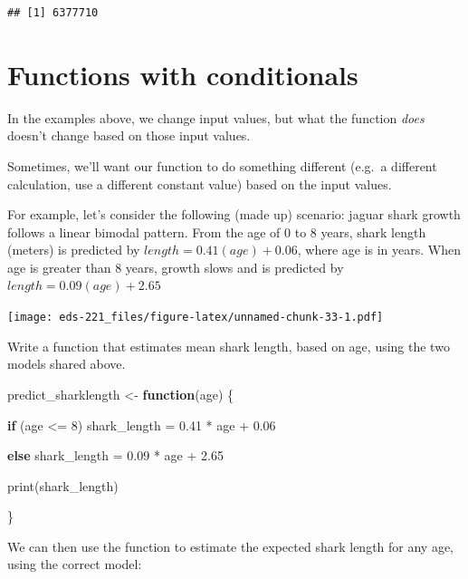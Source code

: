 \documentclass[
]{book}
\newenvironment{Shaded}{\begin{snugshade}}{\end{snugshade}}
\newcommand{\ControlFlowTok}[1]{\textcolor[rgb]{0.13,0.29,0.53}{\textbf{#1}}}
\newcommand{\DecValTok}[1]{\textcolor[rgb]{0.00,0.00,0.81}{#1}}
\newcommand{\FloatTok}[1]{\textcolor[rgb]{0.00,0.00,0.81}{#1}}
\newcommand{\FunctionTok}[1]{\textcolor[rgb]{0.00,0.00,0.00}{#1}}
\newcommand{\NormalTok}[1]{#1}
\newcommand{\OtherTok}[1]{\textcolor[rgb]{0.56,0.35,0.01}{#1}}
\newcommand{\SpecialCharTok}[1]{\textcolor[rgb]{0.00,0.00,0.00}{#1}}
\begin{document}
\begin{verbatim}
## [1] 6377710
\end{verbatim}

\hypertarget{functions-with-conditionals}{%
\section{Functions with conditionals}\label{functions-with-conditionals}}

In the examples above, we change input values, but what the function \emph{does} doesn't change based on those input values.

Sometimes, we'll want our function to do something different (e.g.~a different calculation, use a different constant value) based on the input values.

For example, let's consider the following (made up) scenario: jaguar shark growth follows a linear bimodal pattern. From the age of 0 to 8 years, shark length (meters) is predicted by \(length = 0.41(age)+0.06\), where age is in years. When age is greater than 8 years, growth slows and is predicted by \(length=0.09(age) + 2.65\)

\texttt{[image: eds-221\_files/figure-latex/unnamed-chunk-33-1.pdf]}

Write a function that estimates mean shark length, based on age, using the two models shared above.

\begin{Shaded}
\begin{Highlighting}[]
\NormalTok{predict\_sharklength }\OtherTok{\textless{}{-}} \ControlFlowTok{function}\NormalTok{(age) \{}
  
  \ControlFlowTok{if}\NormalTok{ (age }\SpecialCharTok{\textless{}=} \DecValTok{8}\NormalTok{)}
\NormalTok{    shark\_length }\OtherTok{=} \FloatTok{0.41} \SpecialCharTok{*}\NormalTok{ age }\SpecialCharTok{+} \FloatTok{0.06}
  
  \ControlFlowTok{else} 
\NormalTok{    shark\_length }\OtherTok{=} \FloatTok{0.09} \SpecialCharTok{*}\NormalTok{ age }\SpecialCharTok{+} \FloatTok{2.65}
  
  \FunctionTok{print}\NormalTok{(shark\_length)}
  
\NormalTok{\}}
\end{Highlighting}
\end{Shaded}

We can then use the function to estimate the expected shark length for any age, using the correct model:
\end{document}
